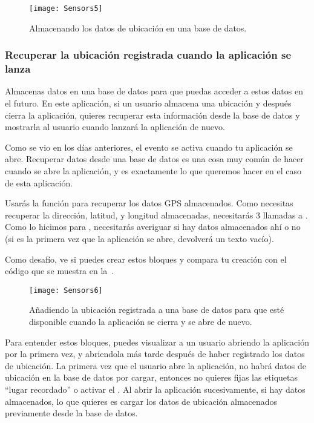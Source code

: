 \begin{figure}[H]
\centering
\texttt{[image: Sensors5]}
\caption{Almacenando los datos de ubicación en una base de datos.}
\label{fig:Sensors5}
\end{figure}

\subsubsection*{Recuperar la ubicación registrada cuando la aplicación se lanza}

Almacenas datos en una base de datos para que puedas acceder a estos
datos en el futuro. En este aplicación, si un usuario almacena una
ubicación y después cierra la aplicación, quieres recuperar esta
información desde la base de datos y mostrarla al usuario cuando
lanzará la aplicación de nuevo.

Como se vio en los días anteriores, el evento
 se activa cuando tu aplicación se
abre. Recuperar datos desde una base de datos es una cosa muy común de
hacer cuando se abre la aplicación, y es exactamente lo que queremos
hacer en el caso de esta aplicación.

Usarás la función  para recuperar los datos
GPS almacenados. Como necesitas recuperar la dirección, latitud, y
longitud almacenadas, necesitarás 3 llamadas a . Como
lo hicimos para , necesitarás averiguar si
hay datos almacenados ahí o no (si es la primera vez que la aplicación
se abre,  devolverá un texto vacío).

Como desafío, ve si puedes crear estos bloques y compara tu creación
con el código que se muestra en la~.

\begin{figure}[H]
\centering
\texttt{[image: Sensors6]}
\caption{Añadiendo la ubicación registrada a una base de datos para
  que esté disponible cuando la aplicación se cierra y se abre de
  nuevo.}
\label{fig:Sensors6}
\end{figure}

Para entender estos bloques, puedes visualizar a un usuario abriendo
la aplicación por la primera vez, y abriendola más tarde después de
haber registrado los datos de ubicación. La primera vez que el usuario
abre la aplicación, no habrá datos de ubicación en la base de datos
por cargar, entonces no quieres fijas las etiquetas ``lugar
recordado'' o activar el . Al
abrir la aplicación sucesivamente, si hay datos almacenados, lo que
quieres es cargar los datos de ubicación almacenados previamente desde
la base de datos.

